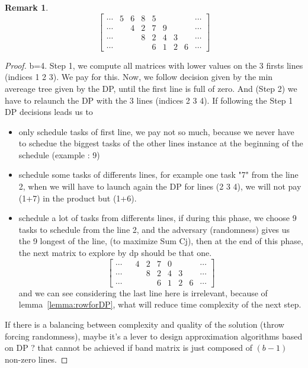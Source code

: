 \documentclass{article}
\newtheorem{remark}{Remark}
\begin{document}
\begin{remark}
\[\begin{bmatrix}  
\cdots & 5 & 6 & 8 & 5 &  &  & &\cdots \\  
\cdots &  & 4 & 2 & 7 & 9 &  & &\cdots  \\ 
\cdots &  &    & 8 & 2 & 4 & 3 & &\cdots  \\   
\cdots &  &    &    & 6 & 1 & 2 & 6& \cdots 
\end{bmatrix}  \]
\end{remark}\begin{proof}
b=4. Step 1, we compute all matrices with lower values on the 3 firsts lines (indices 1 2 3). We pay for this. Now, we follow decision given by the min avereage tree given by the DP, until the first line is full of zero. And (Step 2) we have to relaunch the DP with the 3 lines (indices 2 3 4). If following the Step 1 DP decisions leads us to\begin{itemize}
\item only schedule tasks of first line, we pay not so much, because we never have to schedue the biggest tasks of the other lines instance at the beginning of the schedule (example : 9)
\item schedule some tasks of differents lines, for example one task "7" from the line 2, when we will have to launch again the DP for lines (2 3 4), we will not pay (1+7) in the product but (1+6).
\item schedule a lot of tasks from differents lines, if during this phase, we choose 9 tasks to schedule from the line 2, and the adversary (randomness) gives us the 9 longest of the line, (to maximize Sum Cj), then at the end of this phase, the next matrix to explore by dp should be that one.
\[\begin{bmatrix}  
\cdots &  & 4 & 2 & 7 & 0 &  & &\cdots  \\ 
\cdots &  &    & 8 & 2 & 4 & 3 & &\cdots  \\   
\cdots &  &    &    & 6 & 1 & 2 & 6& \cdots 
\end{bmatrix}  \]
and we can see considering the last line here is irrelevant, because of lemma~\ref{lemma:rowforDP}, what will reduce time complexity of the next step.
\end{itemize}
If there is a balancing between complexity and quality of the solution (throw forcing randomness), maybe it's a lever to design approximation algorithms based on DP ? that cannot be achieved if band matrix is just composed of $(b-1)$ non-zero lines.  \end{proof}
\end{document}
